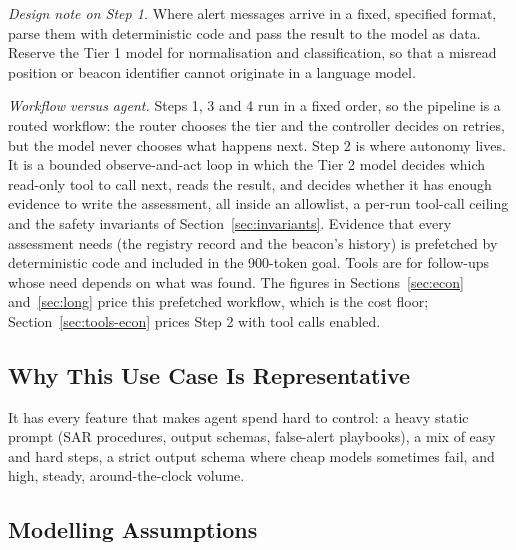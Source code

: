 \documentclass[conference]{IEEEtran}
\begin{document}
\emph{Design note on Step 1.} Where alert messages arrive in a fixed, specified format, parse them with deterministic code and pass the result to the model as data. Reserve the Tier 1 model for normalisation and classification, so that a misread position or beacon identifier cannot originate in a language model.

\emph{Workflow versus agent.} Steps 1, 3 and 4 run in a fixed order, so the pipeline is a routed workflow: the router chooses the tier and the controller decides on retries, but the model never chooses what happens next. Step 2 is where autonomy lives. It is a bounded observe-and-act loop in which the Tier 2 model decides which read-only tool to call next, reads the result, and decides whether it has enough evidence to write the assessment, all inside an allowlist, a per-run tool-call ceiling and the safety invariants of Section~\ref{sec:invariants}. Evidence that every assessment needs (the registry record and the beacon's history) is prefetched by deterministic code and included in the 900-token goal. Tools are for follow-ups whose need depends on what was found. The figures in Sections~\ref{sec:econ} and~\ref{sec:long} price this prefetched workflow, which is the cost floor; Section~\ref{sec:tools-econ} prices Step 2 with tool calls enabled.

\subsection{Why This Use Case Is Representative}

It has every feature that makes agent spend hard to control: a heavy static prompt (SAR procedures, output schemas, false-alert playbooks), a mix of easy and hard steps, a strict output schema where cheap models sometimes fail, and high, steady, around-the-clock volume.

\subsection{Modelling Assumptions}
\label{sec:assumptions}
\end{document}
